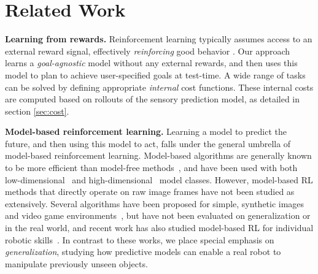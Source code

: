 \section{Related Work}\label{sec:rel_work}

\textbf{Learning from rewards.}
Reinforcement learning typically assumes access to an external reward signal, effectively \emph{reinforcing} good behavior \cite{lillicrap2015continuous, sutton1998reinforcement}. Our approach learns a \emph{goal-agnostic} model without any external rewards, and then uses this model to plan to achieve user-specified goals at test-time.
A wide range of tasks can be solved by defining appropriate \emph{internal} cost functions. These internal costs are computed based on rollouts of the sensory prediction model, as detailed in section \ref{sec:cost}.

\noindent \textbf{Model-based reinforcement learning.} Learning a model to predict the future, and then using this model to act, falls under the general umbrella of model-based reinforcement learning. Model-based algorithms are generally known to be more efficient than model-free methods~\cite{chua2018deep, deisenroth2013survey}, and have been used with both low-dimensional~\cite{deisenroth2011pilco} and high-dimensional~\cite{nagabandi2017neural} model classes. However, model-based RL methods that directly operate on raw image frames have not been studied as extensively. Several algorithms have been proposed for simple, synthetic images~\cite{watter2015embed} and video game environments~\cite{ha2018world}, but have not been evaluated on generalization or in the real world, and recent work has also studied model-based RL for individual robotic skills~\cite{zhang2018solar}. In contrast to these works, we place special emphasis on \emph{generalization}, studying how predictive models can enable a real robot to manipulate previously unseen objects.


